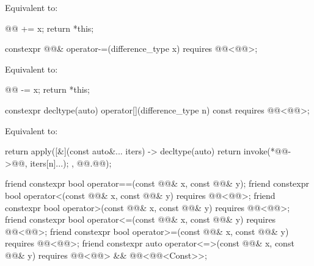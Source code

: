 \begin{itemdescr}
\pnum
\effects
Equivalent to:
\begin{codeblock}
@@ += x;
return *this;
\end{codeblock}
\end{itemdescr}

%
\begin{itemdecl}
constexpr @@& operator-=(difference_type x) requires @@<@@>;
\end{itemdecl}

\begin{itemdescr}
\pnum
\effects
Equivalent to:
\begin{codeblock}
@@ -= x;
return *this;
\end{codeblock}
\end{itemdescr}

%
\begin{itemdecl}
constexpr decltype(auto) operator[](difference_type n) const
  requires @@<@@>;
\end{itemdecl}

\begin{itemdescr}
\pnum
\effects
Equivalent to:
\begin{codeblock}
return apply([&](const auto&... iters) -> decltype(auto) {
  return invoke(*@@->@@, iters[n]...);
}, @@.@@);
\end{codeblock}
\end{itemdescr}

%
\begin{itemdecl}
friend constexpr bool operator==(const @@& x, const @@& y);
friend constexpr bool operator<(const @@& x, const @@& y)
  requires @@<@@>;
friend constexpr bool operator>(const @@& x, const @@& y)
  requires @@<@@>;
friend constexpr bool operator<=(const @@& x, const @@& y)
  requires @@<@@>;
friend constexpr bool operator>=(const @@& x, const @@& y)
  requires @@<@@>;
friend constexpr auto operator<=>(const @@& x, const @@& y)
  requires @@<@@> && @@<@@<Const>>;
\end{itemdecl}

